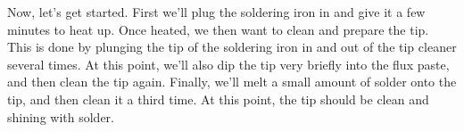 Now, let's get started. First we'll plug the soldering iron in and give it a 
few minutes to heat up. Once heated, we then want to clean and prepare the tip.
This is done by plunging the tip of the soldering iron in and out of the tip 
cleaner several times. At this point, we'll also dip the tip very briefly 
into the flux paste, and then clean the tip again. Finally, we'll melt a small 
amount of solder onto the tip, and then clean it a third time. At this point,
the tip should be clean and shining with solder.











